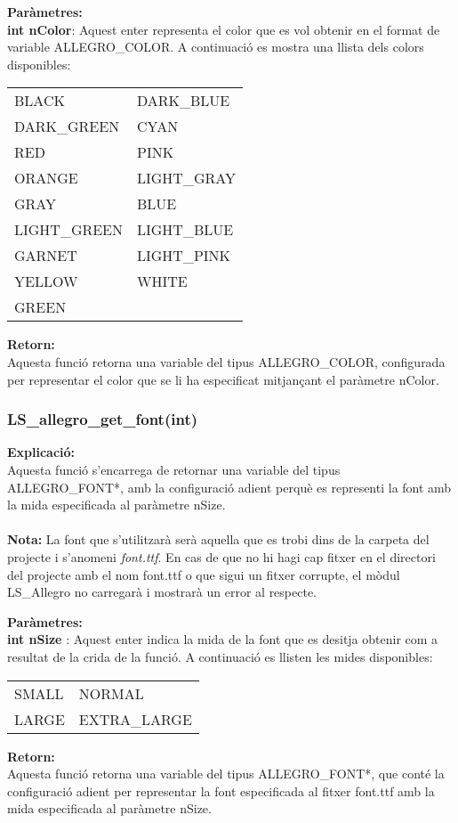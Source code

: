 \documentclass[11pt]{article}
\begin{document}
\noindent \textbf{Paràmetres:}\\
\textbf{int nColor}: Aquest enter representa el color que es vol obtenir en el format de variable ALLEGRO\_COLOR. A continuació es mostra una llista dels colors disponibles:
\begin{center}
\begin{tabular}{l|l}
BLACK  & DARK\_BLUE \\
DARK\_GREEN & CYAN \\
RED  &  PINK \\
ORANGE  & LIGHT\_GRAY \\
GRAY & BLUE \\
LIGHT\_GREEN  & LIGHT\_BLUE \\
GARNET  & LIGHT\_PINK \\
YELLOW & WHITE \\
GREEN \\
\end{tabular}
\end{center}

\noindent \textbf{Retorn:} \\
Aquesta funció retorna una variable del tipus ALLEGRO\_COLOR, configurada per representar el color que se li ha especificat mitjançant el paràmetre nColor.

\pagebreak
\subsubsection{LS\_allegro\_get\_font(int)}
\textbf{Explicació:}\\
Aquesta funció s'encarrega de retornar una variable del tipus ALLEGRO\_FONT*, amb la configuració adient perquè es representi la font amb la mida especificada al paràmetre nSize.\\\\
\textbf{Nota:} La font que s'utilitzarà serà aquella que es trobi dins de la carpeta del projecte i s'anomeni \textit{font.ttf}. En cas de que no hi hagi cap fitxer en el directori del projecte amb el nom font.ttf o que sigui un fitxer corrupte, el mòdul LS\_Allegro no carregarà i mostrarà un error al respecte.

\noindent \textbf{Paràmetres:}\\
\textbf{int nSize} : Aquest enter indica la mida de la font que es desitja obtenir com a resultat de la crida de la funció. A continuació es llisten les mides disponibles:

\begin{center}
\begin{tabular}{l|l}
SMALL & NORMAL\\
LARGE & EXTRA\_LARGE\\
\end{tabular}
\end{center}

\noindent \textbf{Retorn:}\\
Aquesta funció retorna una variable del tipus ALLEGRO\_FONT*, que conté la configuració adient per representar la font especificada al fitxer font.ttf amb la mida especificada al paràmetre nSize.
\end{document}
